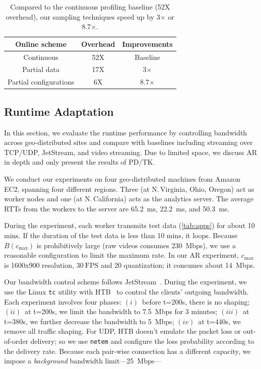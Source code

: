 \begin{table}[t]
  \small
  \centering
  \begin{tabular}{c c c}
    \toprule
    Online scheme & Overhead & Improvements \\
    \midrule
    Continuous & 52X & Baseline \\
    Partial data & 17X & 3$\times$\\
    Partial configurations & 6X & 8.7$\times$ \\
    \bottomrule
  \end{tabular}
  \vspace{0.5em}
  \caption{Compared to the continuous profiling baseline (52X overhead), our
    sampling techniques speed up by 3$\times$ or 8.7$\times$.}
  \label{tab:online}
  \vspace{-1.5em}
\end{table}

\subsection{Runtime Adaptation}
\label{sec:runtime-adaptation}

In this section, we evaluate the runtime performance by controlling bandwidth
across geo-distributed sites and compare \sysname{} with baselines including
streaming over TCP/UDP, JetStream, and video streaming. Due to limited space, we
discuss AR in depth and only present the results of PD/TK.

 We conduct our experiments on four geo-distributed
machines from Amazon EC2, spanning four different regions. Three (at
N.\,Virginia, Ohio, Oregon) act as worker nodes and one (at N.\,California) acts
as the analytics server. The average RTTs from the workers to the server are
\SI{65.2}{\ms}, \SI{22.2}{\ms}, and \SI{50.3}{ms}.

During the experiment, each worker transmits test data (\autoref{tab:apps}) for
about 10 mins. If the duration of the test data is less than 10 mins, it
loops. Because $B(c_{\max})$ is prohibitively large (raw videos consumes
\SI{230}{Mbps}), we use a reasonable configuration to limit the maximum rate. In
our AR experiment, $c_{\max}$ is 1600x900 resolution, \(30~\text{FPS}\) and 20
quantization; it consumes about \SI{14}{Mbps}.

Our bandwidth control scheme follows JetStream~\cite{rabkin2014aggregation}.
During the experiment, we use the Linux \texttt{tc} utility with HTB~\cite{htb,
  lartc} to control the clients' outgoing bandwidth. Each experiment involves
four phases: $(i)$~before t=200s, there is no shaping; $(ii)$~at t=200s, we
limit the bandwidth to \SI{7.5}{Mbps} for 3 minutes; $(iii)$~at t=380s, we
further decrease the bandwidth to \SI{5}{Mbps}; $(iv)$~at t=440s, we remove all
traffic shaping. For UDP, HTB doesn't emulate the packet loss or out-of-order
delivery; so we use \texttt{netem} and configure the loss probability according
to the delivery rate. Because each pair-wise connection has a different
capacity, we impose a \textit{background} bandwidth
limit---\SI{25}{Mbps}---


